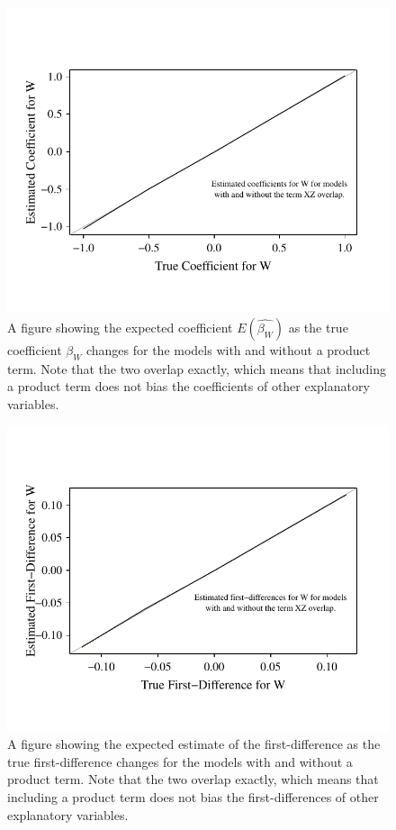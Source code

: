 \documentclass[12pt]{article}
\begin{document}
\begin{appendix}
\begin{figure}[H]
\begin{center}
\includegraphics[scale = .8]{fig/fig-w-est.pdf}
\end{center}\caption{A figure showing the expected coefficient $E(\hat{\beta_W})$ as the true coefficient $\beta_W$ changes for the models with and without a product term. Note that the two overlap exactly, which means that including a product term does not bias the coefficients of other explanatory variables.}\label{fig:w-est}
\end{figure}

\begin{figure}[H]
\begin{center}
\includegraphics[scale = .8]{fig/fig-w-fd.pdf}
\end{center}\caption{A figure showing the expected estimate of the first-difference as the true first-difference changes for the models with and without a product term. Note that the two overlap exactly, which means that including a product term does not bias the first-differences of other explanatory variables.}\label{fig:w-fd}
\end{figure}


\end{appendix}
\end{document}
